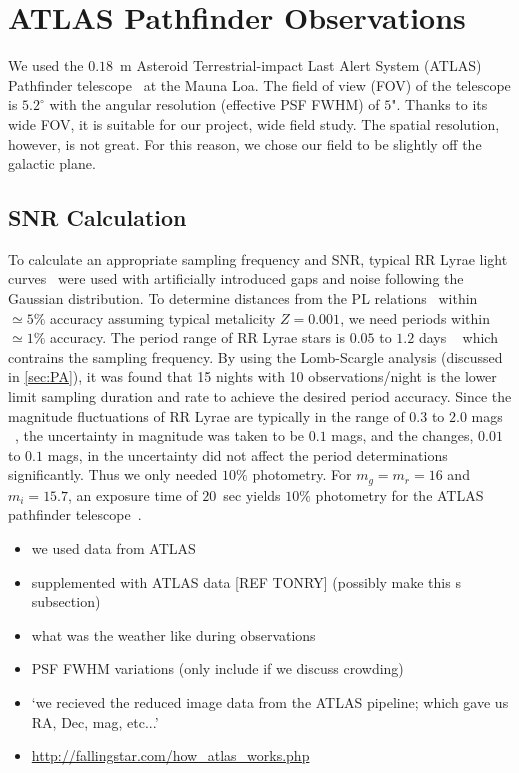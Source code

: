 \documentclass[aps,prb,twocolumn,superscriptaddress]{revtex4-1}
\begin{document}
\section{ATLAS Pathfinder Observations}


We used the $0.18$~m Asteroid Terrestrial-impact Last Alert System (ATLAS) Pathfinder telescope~\citep{fallingstar} at the Mauna Loa. The field of view (FOV) of the telescope is $5.2^{\circ}$ with the angular resolution (effective PSF FWHM) of $5$". Thanks to its wide FOV, it is suitable for our project, wide field study. The spatial resolution, however, is not great. For this reason, we chose our field to be slightly off the galactic plane. 



\subsection{SNR Calculation}\label{sec:SNR}

To calculate an appropriate sampling frequency and SNR, typical RR Lyrae light curves~\cite{RRLyrae} were used with artificially introduced gaps and noise following the Gaussian distribution. To determine distances from the PL relations~\citep{PL} within $\simeq5\%$ accuracy assuming typical metalicity $Z=0.001$, we need periods within $\simeq1\%$ accuracy. The period range of RR Lyrae stars is $0.05$ to $1.2$ days ~\cite{Astro} which contrains the sampling frequency. By using the Lomb-Scargle analysis (discussed in \cref{sec:PA}), it was found that 15 nights with 10 observations/night is the lower limit sampling duration and rate to achieve the desired period accuracy. Since the magnitude fluctuations of RR Lyrae are typically in the range of $0.3$ to $2.0$ mags ~\cite{AAVSO}, the uncertainty in magnitude was taken to be $0.1$ mags, and the changes, $0.01$ to $0.1$ mags, in the uncertainty did not affect the period determinations significantly. Thus we only needed $10\%$ photometry. For $m_g = m_r = 16$ and $m_i = 15.7$, an exposure time of $20$~sec yields $10\%$ photometry for the ATLAS pathfinder telescope~\citep{fallingstar}.



\begin{itemize}
	\item{} we used data from ATLAS
	\item{} supplemented with ATLAS data [REF TONRY] (possibly make this s subsection)
	\item{} what was the weather like during observations
	\item{} PSF FWHM variations (only include if we discuss crowding)
	\item{} `we recieved the reduced image data from the ATLAS pipeline; which gave us RA, Dec, mag, etc...'
	\item{}\url{http://fallingstar.com/how_atlas_works.php}
\end{itemize}
\end{document}
